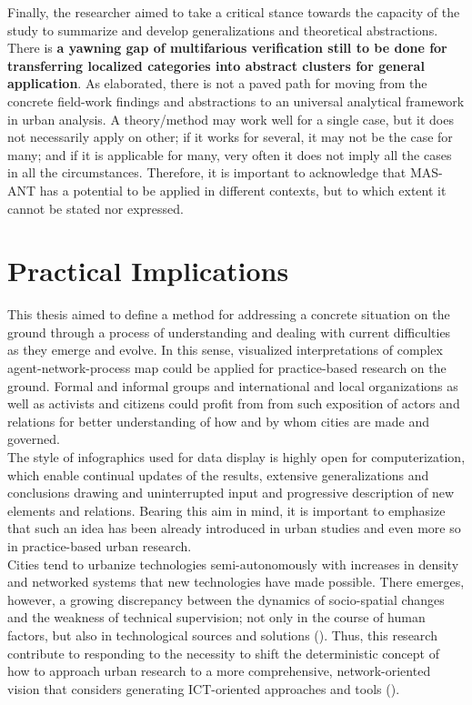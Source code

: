 \documentclass[11pt]{report}
\begin{document}
{Finally, the researcher aimed to take a critical stance towards the capacity of the study to summarize and develop generalizations and theoretical abstractions.
There is \textbf{a yawning gap of multifarious verification still to be done for transferring localized categories into abstract clusters for general application}.
As \href{Robinson}{\citealt{robinson_urban_2013}} elaborated, there is not a paved path for moving from the concrete field-work findings and abstractions to an universal analytical framework in urban analysis. A theory/method may work well for a single case, but it does not necessarily apply on other; if it works for several, it may not be the case for many; and if it is applicable for many, very often it does not imply all the cases in all the circumstances.
Therefore, it is important to acknowledge that MAS-ANT has a potential to be applied in different contexts, but to which extent it cannot be stated nor expressed.


\section{Practical Implications}

This thesis aimed to define a method for addressing a concrete situation on the ground through a process of understanding and dealing with current difficulties as they emerge and evolve.
In this sense, visualized interpretations of complex agent-network-process map could be applied for practice-based research on the ground.
Formal and informal groups and international and local organizations as well as activists and citizens could profit from from such exposition of actors and relations for better understanding of how and by whom cities are made and governed.
\\

The style of infographics used for data display is highly open for computerization, which enable continual updates of the results, extensive generalizations and conclusions drawing and uninterrupted input and progressive description of new elements and relations.
Bearing this aim in mind, it is important to emphasize that such an idea has been already introduced in urban studies and even more so in practice-based urban research.
\\

Cities tend to urbanize technologies semi-autonomously with increases in density and networked systems that new technologies have made possible.
There emerges, however, a growing discrepancy between the dynamics of socio-spatial changes and the weakness of technical supervision; not only in the course of human factors, but also in technological sources and solutions (\href{Vauquelin}{\citealt{vauquelin_planification_2010}}).
Thus, this research contribute to responding to the necessity to shift the deterministic concept of how to approach urban research to a more comprehensive, network-oriented vision that considers generating ICT-oriented approaches and tools (\href{Huang}{\citealt{huang_ict-oriented_2012}}).
\\

}
\end{document}
